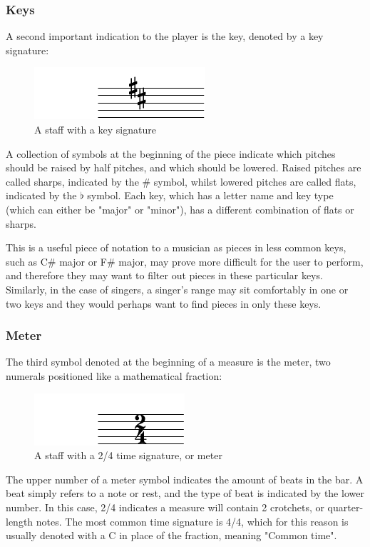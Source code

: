 \subsubsection{Keys}
A second important indication to the player is the key, denoted by a key signature:
\begin{figure}[htbp]
    \centering
        \includegraphics{key-crop.pdf}
    \caption{A staff with a key signature}
\end{figure}

A collection of symbols at the beginning of the piece indicate which pitches should be raised by half pitches, and which should be lowered. Raised pitches are called sharps, indicated by the \# symbol, whilst lowered pitches are called flats, indicated by the $\flat$ symbol. Each key, which has a letter name and key type (which can either be "major" or "minor"), has a different combination of flats or sharps. 

This is a useful piece of notation to a musician as pieces in less common keys, such as C\# major or F\# major, may prove more difficult for the user to perform, and therefore they may want to filter out pieces in these particular keys. Similarly, in the case of singers, a singer's range may sit comfortably in one or two keys and they would perhaps want to find pieces in only these keys. 

\subsubsection{Meter}
The third symbol denoted at the beginning of a measure is the meter, two numerals positioned like a mathematical fraction:

\begin{figure}[htbp]
    \centering
        \includegraphics{meter-crop.pdf}
    \caption{A staff with a 2/4 time signature, or meter}
\end{figure}

The upper number of a meter symbol indicates the amount of beats in the bar. A beat simply refers to a note or rest, and the type of beat is indicated by the lower number. In this case, 2/4 indicates a measure will contain 2 crotchets, or quarter-length notes. The most common time signature is 4/4, which for this reason is usually denoted with a C in place of the fraction, meaning "Common time".


